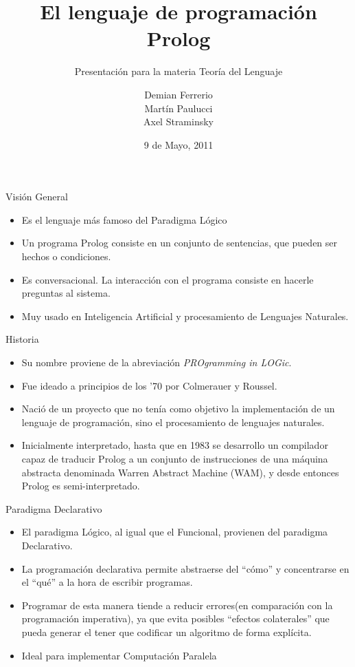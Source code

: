 \documentclass[xcolor=dvipsnames]{beamer}
\title{El lenguaje de programación Prolog}
\subtitle{Presentación para la materia Teoría del Lenguaje}
\author{
Demian Ferrerio \\
Martín Paulucci \\
Axel Straminsky}
\institute[UMBC]{
  Facultad de Ingeniería\\
  Universidad de Buenos Aires \\
}
\date{9 de Mayo, 2011}
\begin{document}
\begin{frame}[plain]
  \titlepage
\end{frame}

\begin{frame}{Visión General}

\begin{itemize}
\item Es el lenguaje más famoso del Paradigma Lógico
\item Un programa Prolog consiste en un conjunto de sentencias, que pueden ser hechos o condiciones.
\item Es conversacional. La interacción con el programa consiste en hacerle preguntas al sistema.
\item Muy usado en Inteligencia Artificial y procesamiento de Lenguajes Naturales.
\end{itemize}

\end{frame}

\begin{frame}{Historia}

\begin{itemize}
\item Su nombre proviene de la abreviación \textit{PROgramming in LOGic}.
\item Fue ideado a principios de los '70 por Colmerauer y Roussel.
\item Nació de un proyecto que no tenía como objetivo la implementación de un lenguaje de programación, sino el procesamiento de lenguajes naturales.
\item Inicialmente interpretado,  hasta que en 1983 se desarrollo un compilador capaz de traducir Prolog a un conjunto de instrucciones de una máquina abstracta denominada Warren Abstract Machine (WAM), y desde entonces Prolog es semi-interpretado.
\end{itemize}

\end{frame}

\begin{frame}{Paradigma Declarativo}
 
\begin{itemize}
 \item El paradigma Lógico, al igual que el Funcional, provienen del paradigma Declarativo.
 \item La programación declarativa permite abstraerse del “cómo” y concentrarse en el “qué” a la hora de escribir programas.
 \item Programar de esta manera tiende a reducir errores(en comparación con la programación imperativa), ya que evita posibles ``efectos colaterales'' que pueda generar el tener que codificar un algoritmo de forma explícita.
 \item Ideal para implementar Computación Paralela
\end{itemize}

\end{frame}
\end{document}
